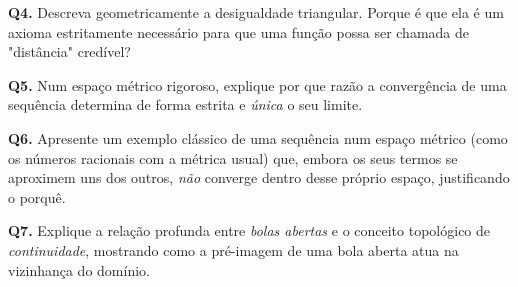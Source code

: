 \begin{oralbox}
  \textbf{Q4.} Descreva geometricamente a desigualdade triangular. Porque é que ela é um axioma estritamente necessário para que uma função possa ser chamada de "distância" credível?
\end{oralbox}

\begin{oralbox}
  \textbf{Q5.} Num espaço métrico rigoroso, explique por que razão a convergência de uma sequência determina de forma estrita e \emph{única} o seu limite.
\end{oralbox}

\begin{oralbox}
  \textbf{Q6.} Apresente um exemplo clássico de uma sequência num espaço métrico (como os números racionais com a métrica usual) que, embora os seus termos se aproximem uns dos outros, \emph{não} converge dentro desse próprio espaço, justificando o porquê.
\end{oralbox}

\begin{oralbox}
  \textbf{Q7.} Explique a relação profunda entre \emph{bolas abertas} e o conceito topológico de \emph{continuidade}, mostrando como a pré-imagem de uma bola aberta atua na vizinhança do domínio.
\end{oralbox}